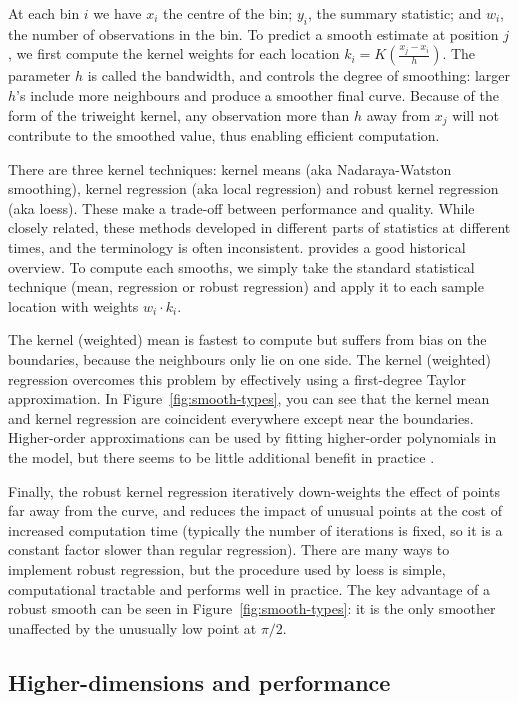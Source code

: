 \documentclass[journal]{vgtc}                %
\begin{document}
At each bin $i$ we have $x_i$ the centre of the bin; $y_i$, the summary statistic; and $w_i$, the number of observations in the bin. To predict a smooth estimate at position $j$, we first compute the kernel weights for each location $k_i = K \left( \frac{x_j - x_i}{h} \right)$. The parameter $h$ is called the bandwidth, and controls the degree of smoothing: larger $h$'s include more neighbours and produce a smoother final curve. Because of the form of the triweight kernel, any observation more than $h$ away from $x_j$ will not contribute to the smoothed value, thus enabling efficient computation. 

There are three kernel techniques: kernel means (aka Nadaraya-Watston smoothing), kernel regression (aka local regression) and robust kernel regression (aka loess). These make a trade-off between performance and quality. While closely related, these methods developed in different parts of statistics at different times, and the terminology is often inconsistent. \citep{cleveland:1996} provides a good historical overview. To compute each smooths, we simply take the standard statistical technique (mean, regression or robust regression) and apply it to each sample location with weights $w_i \cdot k_i$. 

The kernel (weighted) mean is fastest to compute but suffers from bias on the boundaries, because the neighbours only lie on one side. The kernel (weighted) regression overcomes this problem by effectively using a first-degree Taylor approximation. In Figure~\ref{fig:smooth-types}, you can see that the kernel mean and kernel regression are coincident everywhere except near the boundaries. Higher-order approximations can be used by fitting higher-order polynomials in the model, but there seems to be little additional benefit in practice \citep{cleveland:1996}.

Finally, the robust kernel regression iteratively down-weights the effect of points far away from the curve, and reduces the impact of unusual points at the cost of increased computation time (typically the number of iterations is fixed, so it is a constant factor slower than regular regression). There are many ways to implement robust regression, but the procedure used by loess \citep{cleveland:1979} is simple, computational tractable and performs well in practice. The key advantage of a robust smooth can be seen in Figure~\ref{fig:smooth-types}: it is the only smoother unaffected by the unusually low point at $\pi / 2$.

\subsection{Higher-dimensions and performance}
\end{document}
